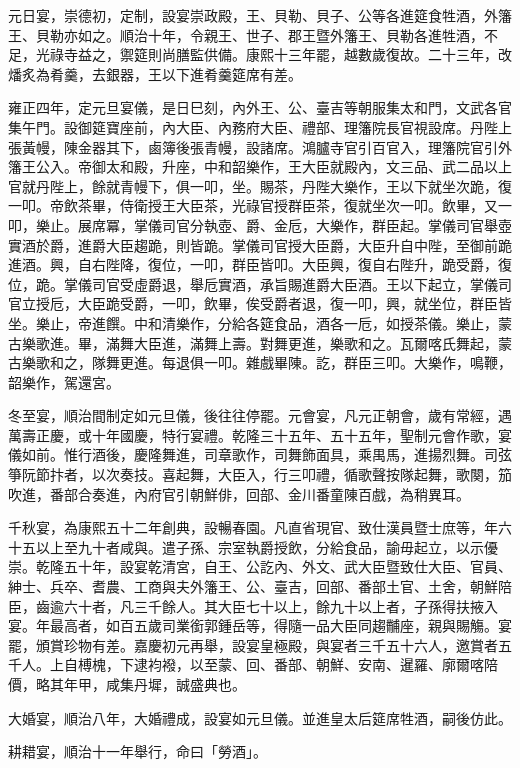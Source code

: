 \begin{pinyinscope}
元日宴，崇德初，定制，設宴崇政殿，王、貝勒、貝子、公等各進筵食牲酒，外籓王、貝勒亦如之。順治十年，令親王、世子、郡王暨外籓王、貝勒各進牲酒，不足，光祿寺益之，禦筵則尚膳監供備。康熙十三年罷，越數歲復故。二十三年，改燔炙為肴羹，去銀器，王以下進肴羹筵席有差。

雍正四年，定元旦宴儀，是日巳刻，內外王、公、臺吉等朝服集太和門，文武各官集午門。設御筵寶座前，內大臣、內務府大臣、禮部、理籓院長官視設席。丹陛上張黃幔，陳金器其下，鹵簿後張青幔，設諸席。鴻臚寺官引百官入，理籓院官引外籓王公入。帝御太和殿，升座，中和韶樂作，王大臣就殿內，文三品、武二品以上官就丹陛上，餘就青幔下，俱一叩，坐。賜茶，丹陛大樂作，王以下就坐次跪，復一叩。帝飲茶畢，侍衛授王大臣茶，光祿官授群臣茶，復就坐次一叩。飲畢，又一叩，樂止。展席冪，掌儀司官分執壺、爵、金卮，大樂作，群臣起。掌儀司官舉壺實酒於爵，進爵大臣趨跪，則皆跪。掌儀司官授大臣爵，大臣升自中陛，至御前跪進酒。興，自右陛降，復位，一叩，群臣皆叩。大臣興，復自右陛升，跪受爵，復位，跪。掌儀司官受虛爵退，舉卮實酒，承旨賜進爵大臣酒。王以下起立，掌儀司官立授卮，大臣跪受爵，一叩，飲畢，俟受爵者退，復一叩，興，就坐位，群臣皆坐。樂止，帝進饌。中和清樂作，分給各筵食品，酒各一卮，如授茶儀。樂止，蒙古樂歌進。畢，滿舞大臣進，滿舞上壽。對舞更進，樂歌和之。瓦爾喀氏舞起，蒙古樂歌和之，隊舞更進。每退俱一叩。雜戲畢陳。訖，群臣三叩。大樂作，鳴鞭，韶樂作，駕還宮。

冬至宴，順治間制定如元旦儀，後往往停罷。元會宴，凡元正朝會，歲有常經，遇萬壽正慶，或十年國慶，特行宴禮。乾隆三十五年、五十五年，聖制元會作歌，宴儀如前。惟行酒後，慶隆舞進，司章歌作，司舞飾面具，乘禺馬，進揚烈舞。司弦箏阮節抃者，以次奏技。喜起舞，大臣入，行三叩禮，循歌聲按隊起舞，歌闋，笳吹進，番部合奏進，內府官引朝鮮俳，回部、金川番童陳百戲，為稍異耳。

千秋宴，為康熙五十二年創典，設暢春園。凡直省現官、致仕漢員暨士庶等，年六十五以上至九十者咸與。遣子孫、宗室執爵授飲，分給食品，諭毋起立，以示優崇。乾隆五十年，設宴乾清宮，自王、公訖內、外文、武大臣暨致仕大臣、官員、紳士、兵卒、耆農、工商與夫外籓王、公、臺吉，回部、番部土官、土舍，朝鮮陪臣，齒逾六十者，凡三千餘人。其大臣七十以上，餘九十以上者，子孫得扶掖入宴。年最高者，如百五歲司業銜郭鍾岳等，得隨一品大臣同趨黼座，親與賜觴。宴罷，頒賞珍物有差。嘉慶初元再舉，設宴皇極殿，與宴者三千五十六人，邀賞者五千人。上自榑槐，下逮袀襏，以至蒙、回、番部、朝鮮、安南、暹羅、廓爾喀陪價，略其年甲，咸集丹墀，誠盛典也。

大婚宴，順治八年，大婚禮成，設宴如元旦儀。並進皇太后筵席牲酒，嗣後仿此。

耕耤宴，順治十一年舉行，命曰「勞酒」。


\end{pinyinscope}
